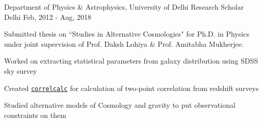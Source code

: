 

\begin{cventries}
	
	\cventry
	{Department of Physics \& Astrophysics, University of Delhi} %
	{Research Scholar} %
	{Delhi} %
	{Feb, 2012 - Aug, 2018} %
	{
		\begin{cvitems} 
			\item {Submitted thesis on ``Studies in Alternative Cosmologies" for Ph.D. in Physics under joint supervision of Prof. Daksh Lohiya \& Prof. Amitabha Mukherjee.}
			\item {Worked on extracting statistical parameters from galaxy distribution using SDSS sky survey}
			\item {Created  \href{http://github.com/rohinkumar/correlcalc}{\texttt{correlcalc}} for calculation of two-point correlation from redshift surveys}
			\item {Studied alternative models of Cosmology and gravity to put observational constraints on them}
		\end{cvitems}
	}
\end{cventries}

